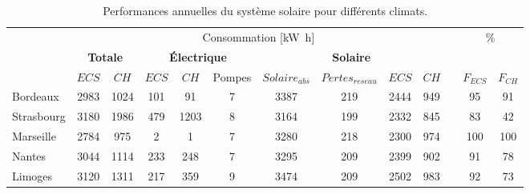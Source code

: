 \begin{table}
\small
\centering
\caption{Performances annuelles du système solaire pour différents climats.}
\label{tab:performance_annuelles}
\begin{tabular}{l c c c c c c c c c c c c}
    \toprule
               &   \multicolumn{9}{c}{Consommation [\si{\kilo\watt\hour}]} & & \multicolumn{2}{c}{\multirow{2}{*}{\%}} \\
    \cmidrule(r){2-10}
               & \multicolumn{2}{c}{\textbf{Totale}} &  \multicolumn{3}{c}{\textbf{Électrique}}  & \multicolumn{4}{c}{\textbf{Solaire}} & \\
    \cmidrule(r){2-3}
    \cmidrule(r){4-6}
    \cmidrule(r){7-10}
    \cmidrule(r){12-13}
               & $ECS$    & $CH$      &  $ECS$        & $CH$ & Pompes    & $Solaire_{abs}$ & $Pertes_{reseau}$ & $ECS$  & $CH$ & & $F_{ECS}$  & $F_{CH}$ \\
    \midrule
    Bordeaux   & \num{2983}     & \num{1024}      &  \num{101}          & \num{91}          &  \num{7}             & \num{3387}                  & \num{219}       & \num{2444}   &  \num{949}    &   & \num{95}         & \num{91}  \\
    Strasbourg & \num{3180}     & \num{1986}      &  \num{479}          & \num{1203}        &  \num{8}             & \num{3164}                  & \num{199}       & \num{2332}   &  \num{845}    &   & \num{83}         & \num{42}  \\
    Marseille  & \num{2784}     & \num{975}       &  \num{2}            & \num{1}           &  \num{7}             & \num{3280}                  & \num{218}       & \num{2300}   &  \num{974}    &   & \num{100}        & \num{100} \\
    Nantes     & \num{3044}     & \num{1114}      &  \num{233}          & \num{248}         &  \num{7}             & \num{3295}                  & \num{209}       & \num{2399}   &  \num{902}    &   & \num{91}         & \num{78}  \\
    Limoges    & \num{3120}     & \num{1311}      &  \num{217}          & \num{359}         &  \num{9}             & \num{3474}                  & \num{209}       & \num{2502}   &  \num{983}    &   & \num{92}         & \num{73}  \\
    \bottomrule
\end{tabular}
\end{table}

